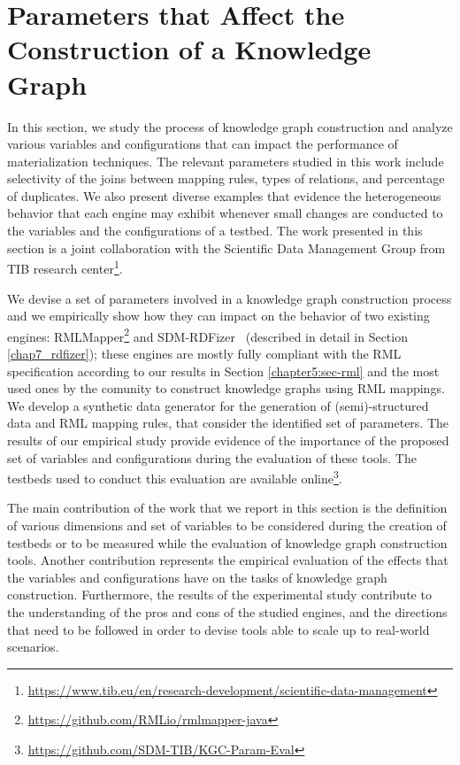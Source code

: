 \section{Parameters that Affect the Construction of a Knowledge Graph}
\label{chapter5:sec-param}
In this section, we study the process of knowledge graph construction and analyze various variables and configurations that can impact the performance of materialization techniques. The relevant parameters studied in this work include selectivity of the joins between mapping rules, types of relations, and percentage of duplicates. We also present diverse examples that evidence the heterogeneous behavior that each engine may exhibit whenever small changes are conducted to the variables and the configurations of a testbed. The work presented in this section is a joint collaboration with the Scientific Data Management Group from TIB research center\footnote{\url{https://www.tib.eu/en/research-development/scientific-data-management}}. 

We devise a set of parameters involved in a knowledge graph construction process and we empirically show how they can impact on the behavior of two existing engines: RMLMapper\footnote{\url{https://github.com/RMLio/rmlmapper-java}} and SDM-RDFizer~\citep{iglesias2020sdm} (described in detail in Section \ref{chap7_rdfizer}); these engines are mostly fully compliant with the RML specification according to our results in Section \ref{chapter5:sec-rml} and the most used ones by the comunity to construct knowledge graphs using RML mappings. We develop a synthetic data generator for the generation of (semi)-structured data and RML mapping rules, that consider the identified set of parameters. The results of our empirical study provide evidence of the importance of the proposed set of variables and configurations during the evaluation of these tools. The testbeds used to conduct this evaluation are available
online\footnote{\url{https://github.com/SDM-TIB/KGC-Param-Eval}}.

The main contribution of the work that we report in this section is the definition of various dimensions and set of variables to be considered during the creation of testbeds or to be measured while the evaluation of knowledge graph construction tools. Another contribution represents the empirical evaluation of the effects that the variables and configurations have on the tasks of knowledge graph construction. Furthermore, the results of the experimental study contribute to the understanding of the pros and cons of the studied engines, and the directions that need to be followed in order to devise tools able to scale up to real-world scenarios.  

